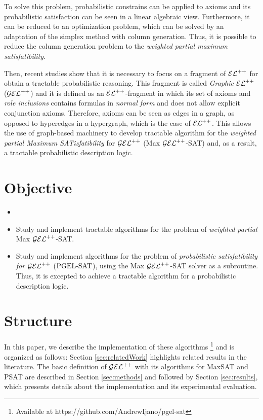     
To solve this problem, probabilistic constrains can be applied to axioms and its probabilistic satisfaction can be seen in a linear algebraic view. Furthermore, it can be reduced to an optimization problem, which can be solved by an adaptation of the simplex method with column generation. \citep{Fin2019b} Thus, it is possible to reduce the column generation problem to the \emph{weighted partial maximum satisfatibility}.


Then, recent studies show that it is necessary to focus on a fragment of $\mathcal{EL}^{++}$ for obtain a tractable probabilistic reasoning. This fragment is called \emph{Graphic} $\mathcal{EL}^{++}$ ($\mathcal{GEL}^{++}$) and it is defined as an $\mathcal{EL}^{++}$-fragment in which its set of axioms and \emph{role inclusions} contains formulas in \emph{normal form} and does not allow explicit conjunction axioms. Therefore, axioms can be seen as edges in a graph, as opposed to hyperedges in a hypergraph, which is the case of $\mathcal{EL}^{++}$. This allows the use of graph-based machinery to develop tractable algorithm for the \emph{weighted partial Maximum SATisfatibility} for $\mathcal{GEL}^{++}$ (Max $\mathcal{GEL}^{++}$-SAT) and, as a result, a tractable probabilistic description logic.


\section{Objective}
\begin{itemize}
  \item {}
  \item Study and implement tractable algorithms for the problem of \emph{weighted partial} Max $\mathcal{GEL}^{++}$-SAT. 
  \item Study and implement algorithms for the problem of \emph{probabilistic satisfatibility for $\mathcal{GEL}^{++}$} ($\text{PGEL-SAT}$), using the Max $\mathcal{GEL}^{++}$-SAT solver as a subroutine. Thus, it is excepted to achieve a tractable algorithm for a probabilistic description logic.
\end{itemize}

\section{Structure}
In this paper, we describe the implementation of these algorithms \footnote{Available at https://github.com/AndrewIjano/pgel-sat} and is organized as follows: Section \ref{sec:relatedWork} highlights related results in the literature. The basic definition of $\mathcal{GEL}^{++}$ with its algorithms for MaxSAT and PSAT are described in Section \ref{sec:methods} and followed by Section \ref{sec:results}, which presents details about the implementation and its experimental evaluation.

